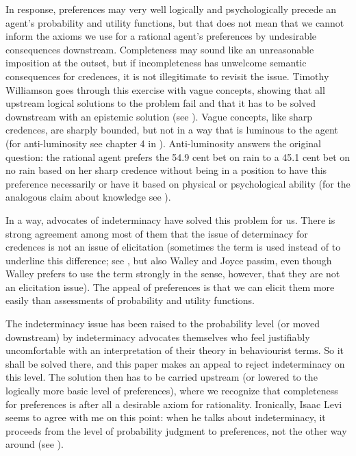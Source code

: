 In response, preferences may very well logically and psychologically precede an agent's probability and utility functions, but that does not mean that we cannot inform the axioms we use for a rational agent's preferences by undesirable consequences downstream. Completeness may sound like an unreasonable imposition at the outset, but if incompleteness has unwelcome semantic consequences for credences, it is not illegitimate to revisit the issue. Timothy Williamson goes through this exercise with vague concepts, showing that all upstream logical solutions to the problem fail and that it has to be solved downstream with an epistemic solution (see ). Vague concepts, like sharp credences, are sharply bounded, but not in a way that is luminous to the agent (for anti-luminosity see chapter 4 in ). Anti-luminosity answers the original question: the rational agent prefers the 54.9 cent bet on rain to a 45.1 cent bet on no rain based on her sharp credence without being in a position to have this preference necessarily or have it based on physical or psychological ability (for the analogous claim about knowledge see ).

In a way, advocates of indeterminacy have solved this problem for us. There is strong agreement among most of them that the issue of determinacy for credences is not an issue of elicitation (sometimes the term  is used instead of  to underline this difference; see , but also Walley and Joyce passim, even though Walley prefers to use the term  strongly in the sense, however, that they are not an elicitation issue). The appeal of preferences is that we can elicit them more easily than assessments of probability and utility functions.

The indeterminacy issue has been raised to the probability level (or moved downstream) by indeterminacy advocates themselves who feel justifiably uncomfortable with an interpretation of their theory in behaviourist terms. So it shall be solved there, and this paper makes an appeal to reject indeterminacy on this level. The solution then has to be carried upstream (or lowered to the logically more basic level of preferences), where we recognize that completeness for preferences is after all a desirable axiom for rationality. Ironically, Isaac Levi seems to agree with me on this point: when he talks about indeterminacy, it proceeds from the level of probability judgment to preferences, not the other way around (see ).


